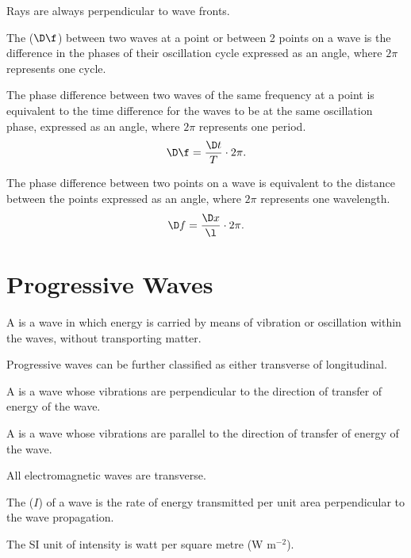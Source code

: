 Rays are always perpendicular to wave fronts.

\begin{definition}
    The  ($\D \f$) between two waves at a point or between 2 points on a wave is the difference in the phases of their oscillation cycle expressed as an angle, where $2\pi$ represents one cycle.
\end{definition}

The phase difference between two waves of the same frequency at a point is equivalent to the time difference for the waves to be at the same oscillation phase, expressed as an angle, where $2\pi$ represents one period. \[\D \f = \frac{\D t}{T} \cdot 2\pi.\]

The phase difference between two points on a wave is equivalent to the distance between the points expressed as an angle, where $2\pi$ represents one wavelength. \[\D f = \frac{\D x}{\l} \cdot 2\pi.\]

\section{Progressive Waves}

\begin{definition}
    A  is a wave in which energy is carried by means of vibration or oscillation within the waves, without transporting matter.
\end{definition}

Progressive waves can be further classified as either transverse of longitudinal.

\begin{definition}
    A  is a wave whose vibrations are perpendicular to the direction of transfer of energy of the wave.
\end{definition}

\begin{definition}
    A  is a wave whose vibrations are parallel to the direction of transfer of energy of the wave.
\end{definition}

All electromagnetic waves are transverse.

\begin{definition}
    The  ($I$) of a wave is the rate of energy transmitted per unit area perpendicular to the wave propagation.
\end{definition}

The SI unit of intensity is watt per square metre (W m$^{-2}$).

